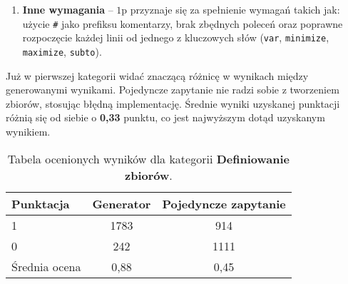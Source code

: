 \begin{enumerate}
\item \textbf{Inne wymagania} -- $1$p przyznaje się za spełnienie wymagań takich jak: użycie \texttt{\#} jako prefiksu komentarzy, brak zbędnych poleceń oraz poprawne rozpoczęcie każdej linii od jednego z kluczowych słów (\texttt{var}, \texttt{minimize}, \texttt{maximize}, \texttt{subto}). %
\end{enumerate}


Już w pierwszej kategorii widać znaczącą różnicę w wynikach między generowanymi wynikami. Pojedyncze zapytanie nie radzi sobie z tworzeniem zbiorów, stosując błędną implementację. Średnie wyniki uzyskanej punktacji różnią się od siebie o \textbf{0,33} punktu, co jest najwyższym dotąd uzyskanym wynikiem.

\begin{table}[ht]
\caption{Tabela ocenionych wyników dla kategorii \textbf{Definiowanie zbiorów}.}\label{tab:tabela17}
\centering%
\begin{tabular}{|l|c|c|}
\hline
\textbf{Punktacja} & \textbf{Generator} & \textbf{Pojedyncze zapytanie}\\
\hline
1 & 1783 & 914 \\
\hline
0 & 242 & 1111 \\
\hline
Średnia ocena & 0,88 & 0,45 \\
\hline
\end{tabular}
\end{table}


